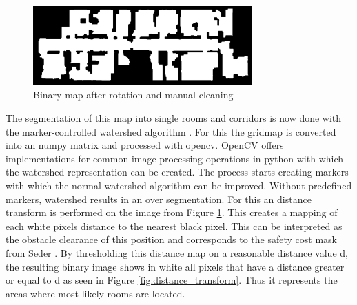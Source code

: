 \begin{figure}[h]
    \centering
    \includegraphics[width=0.75\textwidth]{figures/50_implementation/ryu.png}
    \caption[Binary map after rotation and manual cleaning]{Binary map after rotation and manual cleaning}
    \label{fig:map_cleaned}
\end{figure}

The segmentation of this map into single rooms and corridors is now done with the marker-controlled watershed algorithm \cite{parvati_image_2009}. For this the gridmap is converted into an numpy matrix and processed with opencv. OpenCV offers implementations for common image processing operations in python with which the watershed representation can be created. The process starts creating markers with which the normal watershed algorithm can be improved. Without predefined markers, watershed results in an over segmentation. For this an distance transform is performed on the image from Figure \ref{fig:map_cleaned}. This creates a mapping of each white pixels distance to the nearest black pixel. This can be interpreted as the obstacle clearance of this position and corresponds to the safety cost mask from Seder \cite{seder_hierarchical_2011}. By thresholding this distance map on a reasonable distance value d, the resulting binary image shows in white all pixels that have a distance greater or equal to d as seen in Figure \ref{fig:distance_transform}. Thus it represents the areas where most likely rooms are located. 

